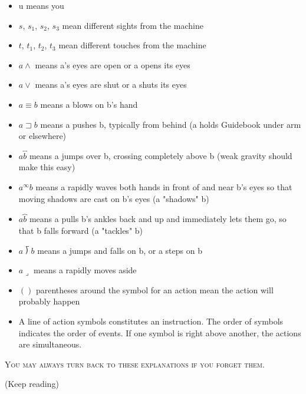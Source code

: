\begin{itemize}
\item u means you 

\item $s$, $s_1$, $s_2$, $s_3$ mean different sights from the machine 

\item $t$, $t_1$, $t_2$, $t_3$ mean different touches from the machine 

\item $a\wedge$ means a's eyes are open or a opens its eyes 

\item $a\vee$ means a's eyes are shut or a shuts its eyes 

\item $a\equiv b$ means a blows on b's hand 

\item $a\sqsupset b$ means a pushes b, typically from behind 
(a holds Guidebook under arm or elsewhere) 

\item $a\overbracket{b}$ means a jumps over b, crossing completely above b (weak gravity 
should make this easy) 

\item $a^\infty b$ means a rapidly waves both hands in front of and near b's eyes so that 
moving shadows are cast on b's eyes (a "shadows" b) 

\item $a\overbrace{b}$ means a pulls b's ankles back and up and immediately lets them go, so 
that b falls forward (a "tackles" b) 

\item $a\longdivision{b}$ means a jumps and falls on b, or a steps on b 

\item $a\lrcorner$ means a rapidly moves aside 

\item $()$ parentheses around the symbol for an action mean the action will 
probably happen 

\item A line of action symbols constitutes an instruction. The order of symbols 
indicates the order of events. If one symbol is right above another, the 
actions are simultaneous. 
\end{itemize}

\textsc{You may always turn back to these explanations if you forget them.}

(Keep reading) 

